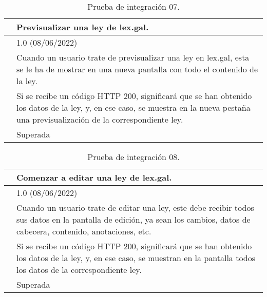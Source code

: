 \begin{table}[H]
\begin{center}
\begin{tabular}{|p{3cm}|p{10cm}|} \hline
\centering {\bf PI-07} & Previsualizar una ley de lex.gal.  \\ \hline\hline
\centering {\bf Versión} & 1.0 (08/06/2022) \\ \hline
\centering {\bf Descripción} & Cuando un usuario trate de previsualizar una ley en lex.gal, esta se le ha de mostrar en una nueva pantalla con todo el contenido de la ley. \\ \hline
\centering {\bf Criterio de aceptación} & Si se recibe un código HTTP 200, significará que se han obtenido los datos de la ley, y, en ese caso, se muestra en la nueva pestaña una previsualización de la correspondiente ley. \\ \hline
\centering {\bf Estado} & Superada \\ \hline
\end{tabular}
\caption{Prueba de integración 07.}
\label{enlacePI7}
\end{center}
\end{table}

\begin{table}[H]
\begin{center}
\begin{tabular}{|p{3cm}|p{10cm}|} \hline
\centering {\bf PI-08} & Comenzar a editar una ley de lex.gal.  \\ \hline\hline
\centering {\bf Versión} & 1.0 (08/06/2022) \\ \hline
\centering {\bf Descripción} & Cuando un usuario trate de editar una ley, este debe recibir todos sus datos en la pantalla de edición, ya sean los cambios, datos de cabecera, contenido, anotaciones, etc. \\ \hline
\centering {\bf Criterio de aceptación} & Si se recibe un código HTTP 200, significará que se han obtenido los datos de la ley, y, en ese caso, se muestran en la pantalla todos los datos de la correspondiente ley. \\ \hline
\centering {\bf Estado} & Superada \\ \hline
\end{tabular}
\caption{Prueba de integración 08.}
\label{enlacePI8}
\end{center}
\end{table}

